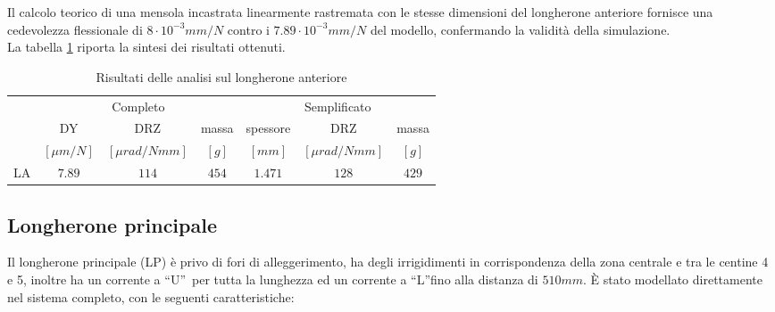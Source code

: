 \documentclass[
10pt, %
a4paper, %
oneside, %
headinclude,footinclude, %
BCOR5mm, %
]{scrartcl}
\begin{document}
Il calcolo teorico di una mensola incastrata linearmente rastremata con le stesse dimensioni del longherone anteriore fornisce una cedevolezza flessionale di $8\cdot10^{-3} mm/N$ contro i $7.89\cdot10^{-3} mm/N$ del modello, confermando la validità della simulazione.\\
La tabella \ref{tab:FS} riporta la sintesi dei risultati ottenuti.

\begin{table}[hbt]
	\caption{Risultati delle analisi sul longherone anteriore}
	\centering
	\begin{tabular}{rcccccc}
		\toprule
		& \multicolumn{3}{c}{Completo} & \multicolumn{3}{c}{Semplificato}\\
		\cmidrule(r){2-4} \cmidrule(l){5-7} 
		& DY  & DRZ & massa & spessore & DRZ  & massa \\
		& $[\mu m/N]$ & $[\mu rad/Nmm]$ & $[g]$ & $[mm]$ & $[\mu rad/Nmm]$ & $[g]$ \\
		\midrule
		LA & $7.89$ & $114$ & $454$ & $1.471$ & $128$ & $429$ \\
		\bottomrule
	\end{tabular}
	\label{tab:FS}
\end{table}


\subsection{Longherone principale}

Il longherone principale (LP) è privo di fori di alleggerimento, ha degli irrigidimenti in corrispondenza della zona centrale e tra le centine 4 e 5, inoltre ha un corrente a \textquotedblleft U\textquotedblright \ per tutta la lunghezza ed un corrente a \textquotedblleft L\textquotedblright fino alla distanza di $510mm$. \`{E} stato modellato direttamente nel sistema completo, con le seguenti caratteristiche:
\end{document}

